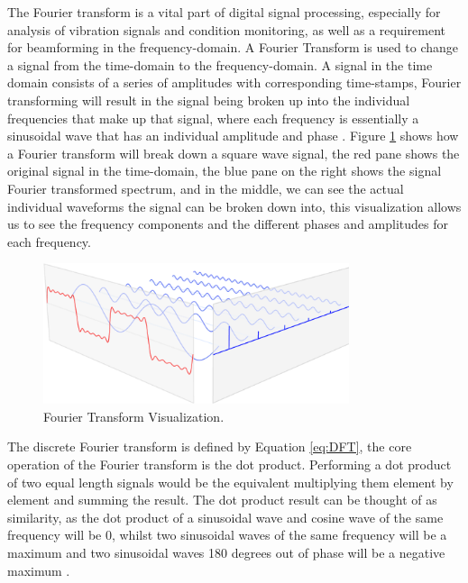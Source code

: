 \documentclass{UoNMCHA}
\numberwithin{equation}{section}
\begin{document}
    The Fourier transform is a vital part of digital signal processing, especially for analysis of vibration signals and condition monitoring, as well as a requirement for beamforming in the frequency-domain. A Fourier Transform is used to change a signal from the time-domain to the frequency-domain. A signal in the time domain consists of a series of amplitudes with corresponding time-stamps, Fourier transforming will result in the signal being broken up into the individual frequencies that make up that signal, where each frequency is essentially a sinusoidal wave that has an individual amplitude and phase \citep{Sch17}. Figure \ref{fig:Fourier Transform} shows how a Fourier transform will break down a square wave signal, the red pane shows the original signal in the time-domain, the blue pane on the right shows the signal Fourier transformed spectrum, and in the middle, we can see the actual individual waveforms the signal can be broken down into, this visualization allows us to see the frequency components and the different phases and amplitudes for each frequency.
    
    \begin{figure}[H]
        \centering
        \includegraphics[keepaspectratio, width = 0.8\textwidth]{Figures/FFT.png}
        \caption{Fourier Transform Visualization.}
        \label{fig:Fourier Transform}
    \end{figure}
    
    The discrete Fourier transform is defined by Equation \ref{eq:DFT}, the core operation of the Fourier transform is the dot product. Performing a dot product of two equal length signals would be the equivalent multiplying them element by element and summing the result. The dot product result can be thought of as similarity, as the dot product of a sinusoidal wave and cosine wave of the same frequency will be 0, whilst two sinusoidal waves of the same frequency will be a maximum and two sinusoidal waves 180 degrees out of phase will be a negative maximum \citep{Sch17}. 
    
\end{document}
